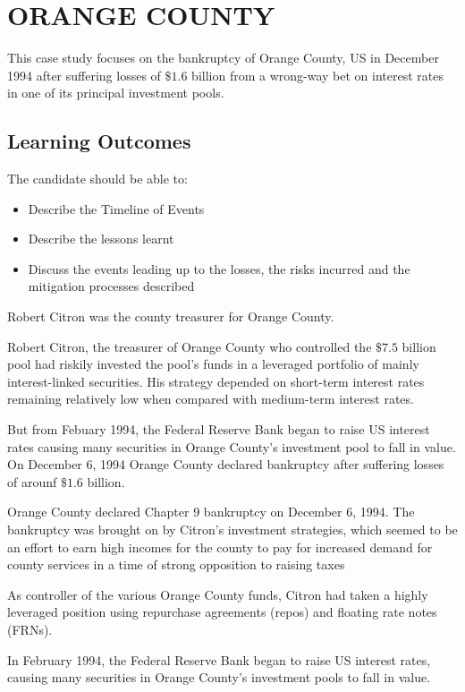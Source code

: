 \documentclass[PRMIA4A.tex]{subfiles}
\begin{document}
 
\newpage
\section{ORANGE COUNTY}


This case study focuses on the bankruptcy of Orange County, US in December 1994 after suffering losses of $\$1.6$ billion from a wrong-way bet on interest rates in one of its principal investment pools.

\subsection{Learning Outcomes}
The candidate should be able to:
\begin{itemize}
	\item Describe the Timeline of Events
	\item Describe the lessons learnt
	\item Discuss the events leading up to the losses, the risks
	incurred and the mitigation processes described
\end{itemize}


Robert Citron was the county treasurer for Orange County.


Robert Citron, the treasurer of Orange County who controlled the $\$7.5$ billion pool had riskily invested the pool’s funds in a leveraged portfolio of mainly interest-linked securities. His strategy depended on short-term interest rates remaining relatively low when compared with medium-term interest rates.

But from Febuary 1994, the Federal Reserve Bank began to raise US interest rates causing many securities in Orange County’s investment pool to fall in value.
On December 6, 1994 Orange County declared bankruptcy after suffering losses of arounf $\$1.6$ billion.

Orange County declared Chapter 9 bankruptcy on December 6, 1994. The bankruptcy was brought on by Citron's investment strategies, which seemed to be an effort to earn high incomes for the county to pay for increased demand for county services in a time of strong opposition to raising taxes


As controller of the various Orange County funds, Citron had taken a highly leveraged position using repurchase agreements (repos) and floating rate notes (FRNs).


In February 1994, the Federal Reserve Bank began to raise US interest rates, causing many securities in Orange County's investment pools to fall in value. 
\end{document}
